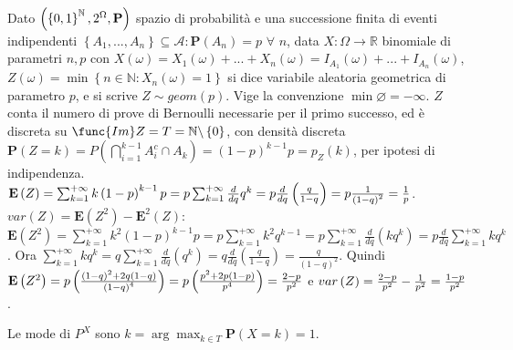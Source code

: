 \documentclass{article}
\begin{document}
\begin{description}
\item[E6] Dato $\left( \left\{ 0,1\right\} ^{%
\mathbb{N}
},2^{\Omega },\mathbf{P}\right) $ spazio di probabilit\`{a} e una
successione finita di eventi indipendenti $\left\{ A_{1},...,A_{n}\right\}
\subseteq \mathcal{A}:\mathbf{P}\left( A_{n}\right) =p$ $\forall $ $n$, data 
$X:\Omega \rightarrow 
\mathbb{R}
$ binomiale di parametri $n,p$ con $X\left( \omega \right) =X_{1}\left(
\omega \right) +...+X_{n}\left( \omega \right) =I_{A_{1}}\left( \omega
\right) +...+I_{A_{n}}\left( \omega \right) $, $Z\left( \omega \right) =\min
\left\{ n\in 
\mathbb{N}
:X_{n}\left( \omega \right) =1\right\} $ si dice variabile aleatoria
geometrica di parametro $p$, e si scrive $Z\sim geom\left( p\right) $. Vige
la convenzione $\min \varnothing =-\infty $. $Z$ conta il numero di prove di
Bernoulli necessarie per il primo successo, ed \`{e} discreta su $\func{Im}%
Z=T=%
\mathbb{N}
\backslash \left\{ 0\right\} $, con densit\`{a} discreta $\mathbf{P}\left(
Z=k\right) =P\left( \bigcap_{i=1}^{k-1}A_{i}^{c}\cap A_{k}\right) =\left(
1-p\right) ^{k-1}p=p_{Z}\left( k\right) $, per ipotesi di indipendenza. $%
\mathbf{E}\left( Z\right) =\sum_{k=1}^{+\infty }k\left( 1-p\right)
^{k-1}p=p\sum_{k=1}^{+\infty }\frac{d}{dq}q^{k}=p\frac{d}{dq}\left( \frac{q}{%
1-q}\right) =p\frac{1}{\left( 1-q\right) ^{2}}=\frac{1}{p}$. $var\left(
Z\right) =\mathbf{E}\left( Z^{2}\right) -\mathbf{E}^{2}\left( Z\right) $: $%
\mathbf{E}\left( Z^{2}\right) =\sum_{k=1}^{+\infty }k^{2}\left( 1-p\right)
^{k-1}p=p\sum_{k=1}^{+\infty }k^{2}q^{k-1}=p\sum_{k=1}^{+\infty }\frac{d}{dq}%
\left( kq^{k}\right) =p\frac{d}{dq}\sum_{k=1}^{+\infty }kq^{k}$. Ora $%
\sum_{k=1}^{+\infty }kq^{k}=q\sum_{k=1}^{+\infty }\frac{d}{dq}\left(
q^{k}\right) =q\frac{d}{dq}\left( \frac{q}{1-q}\right) =\frac{q}{\left(
1-q\right) ^{2}}$. Quindi $\mathbf{E}\left( Z^{2}\right) =p\left( \frac{%
\left( 1-q\right) ^{2}+2q\left( 1-q\right) }{\left( 1-q\right) ^{4}}\right)
=p\left( \frac{p^{2}+2p\left( 1-p\right) }{p^{4}}\right) =\frac{2-p}{p^{2}}$
e $var\left( Z\right) =\frac{2-p}{p^{2}}-\frac{1}{p^{2}}=\allowbreak \frac{%
1-p}{p^{2}}$.

\item Le mode di $P^{X}$ sono $k=\arg \max_{k\in T}\mathbf{P}\left(
X=k\right) =1$.


\end{description}
\end{document}
